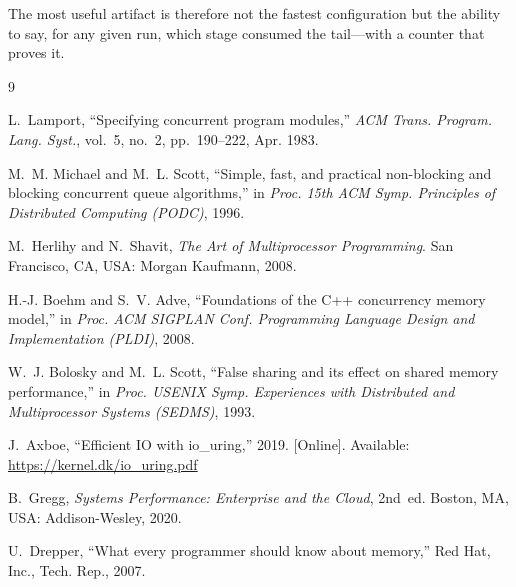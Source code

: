 \documentclass[conference]{IEEEtran}
\begin{document}
The most useful artifact is therefore not the fastest configuration but the
ability to say, for any given run, which stage consumed the tail---with a counter
that proves it.

\begin{thebibliography}{9}

L.~Lamport, ``Specifying concurrent program modules,'' \emph{ACM Trans. Program.
Lang. Syst.}, vol.~5, no.~2, pp.~190--222, Apr. 1983.

M.~M. Michael and M.~L. Scott, ``Simple, fast, and practical non-blocking and
blocking concurrent queue algorithms,'' in \emph{Proc. 15th ACM Symp. Principles
of Distributed Computing (PODC)}, 1996.

M.~Herlihy and N.~Shavit, \emph{The Art of Multiprocessor Programming}. San
Francisco, CA, USA: Morgan Kaufmann, 2008.

H.-J. Boehm and S.~V. Adve, ``Foundations of the C++ concurrency memory model,''
in \emph{Proc. ACM SIGPLAN Conf. Programming Language Design and Implementation
(PLDI)}, 2008.

W.~J. Bolosky and M.~L. Scott, ``False sharing and its effect on shared memory
performance,'' in \emph{Proc. USENIX Symp. Experiences with Distributed and
Multiprocessor Systems (SEDMS)}, 1993.

J.~Axboe, ``Efficient IO with io\_uring,'' 2019. [Online].
Available: \url{https://kernel.dk/io_uring.pdf}

B.~Gregg, \emph{Systems Performance: Enterprise and the Cloud}, 2nd~ed. Boston,
MA, USA: Addison-Wesley, 2020.

U.~Drepper, ``What every programmer should know about memory,'' Red Hat, Inc.,
Tech. Rep., 2007.

\end{thebibliography}
\end{document}
